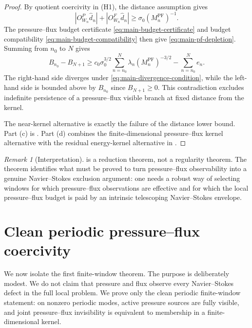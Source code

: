 \documentclass[11pt]{article}
\numberwithin{equation}{section}
\theoremstyle{plain}
\theoremstyle{definition}
\theoremstyle{remark}
\newtheorem{remark}[theorem]{Remark}
\newcommand{\PF}{\mathrm{PF}}
\begin{document}
\begin{proof}
By quotient coercivity in (H1), the distance assumption gives
\[
        |O^P_{W_n}\widehat d_n|+|O^F_{W_n}\widehat d_n|
        \ge
        \sigma_0(M_n^{\PF})^{-1}.
\]
The pressure--flux budget certificate \eqref{eq:main-budget-certificate} and budget compatibility \eqref{eq:main-budget-compatibility} then give \eqref{eq:main-pf-depletion}.  Summing from \(n_0\) to \(N\) gives
\[
        B_{n_0}-B_{N+1}
        \ge
        c_0\sigma_0^{3/2}
        \sum_{n=n_0}^{N}\lambda_n(M_n^{\PF})^{-3/2}
        -
        \sum_{n=n_0}^{N}e_n.
\]
The right-hand side diverges under \eqref{eq:main-divergence-condition}, while the left-hand side is bounded above by \(B_{n_0}\) since \(B_{N+1}\ge0\).  This contradiction excludes indefinite persistence of a pressure--flux visible branch at fixed distance from the kernel.

The near-kernel alternative is exactly the failure of the distance lower bound.  Part (c) is .  Part (d) combines the finite-dimensional pressure--flux kernel alternative with the residual energy-kernel alternative in .
\end{proof}
\begin{remark}[Interpretation]
 is a reduction theorem, not a regularity theorem.  The theorem identifies what must be proved to turn pressure--flux observability into a genuine Navier--Stokes exclusion argument: one needs a robust way of selecting windows for which pressure--flux observations are effective and for which the local pressure--flux budget is paid by an intrinsic telescoping Navier--Stokes envelope.
\end{remark}

\section{Clean periodic pressure--flux coercivity}
\label{sec:clean-periodic-pf}

We now isolate the first finite-window theorem.  The purpose is deliberately modest.  We do not claim that pressure and flux observe every Navier--Stokes defect in the full local problem.  We prove only the clean periodic finite-window statement: on nonzero periodic modes, active pressure sources are fully visible, and joint pressure--flux invisibility is equivalent to membership in a finite-dimensional kernel.
\end{document}

